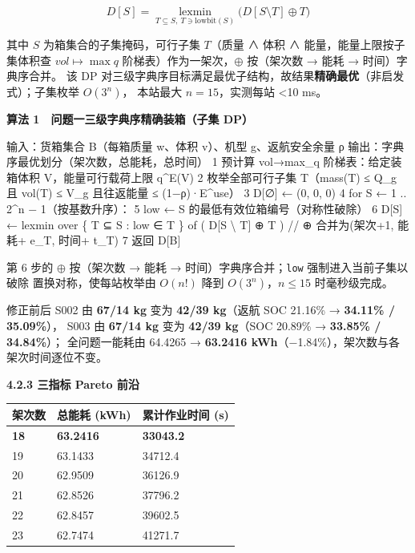 \documentclass[
  10.5pt,
]{extarticle}
\newenvironment{Shaded}{}{}
\newcommand{\NormalTok}[1]{#1}
\newcounter{none} %
\begin{document}
\[D[S]=\operatorname*{lexmin}_{T\subseteq S,\ T\ni \text{lowbit}(S)} \bigl(D[S\setminus T]\oplus T\bigr)\]

其中 \(S\) 为箱集合的子集掩码，可行子集 \(T\)（质量 ∧ 体积 ∧
能量，能量上限按子集体积查 \(vol\mapsto\max q\)
阶梯表）作为一架次，\(\oplus\) 按（架次数 → 能耗 → 时间）字典序合并。 该
DP
对三级字典序目标满足最优子结构，故结果\textbf{精确最优}（非启发式）；子集枚举
\(O(3^n)\)， 本站最大 \(n=15\)，实测每站 \textless10 ms。

\textbf{算法 1　问题一三级字典序精确装箱（子集 DP）}

\begin{Shaded}
\begin{Highlighting}[]
\NormalTok{输入：货箱集合 B（每箱质量 w、体积 v）、机型 g、返航安全余量 ρ}
\NormalTok{输出：字典序最优划分（架次数，总能耗，总时间）}
\NormalTok{ 1  预计算 vol→max\_q 阶梯表：给定装箱体积 V，能量可行载荷上限 q\^{}E(V)}
\NormalTok{ 2  枚举全部可行子集 T（mass(T) ≤ Q\_g 且 vol(T) ≤ V\_g 且往返能量 ≤ (1−ρ)·E\^{}use）}
\NormalTok{ 3  D[∅] ← (0, 0, 0)}
\NormalTok{ 4  for S ← 1 .. 2\^{}n − 1（按基数升序）：}
\NormalTok{ 5      low ← S 的最低有效位箱编号（对称性破除）}
\NormalTok{ 6      D[S] ← lexmin over \{ T ⊆ S : low ∈ T \} of ( D[S \textbackslash{} T] ⊕ T )   // ⊕ 合并为(架次+1, 能耗+ e\_T, 时间+ t\_T)}
\NormalTok{ 7  返回 D[B]}
\end{Highlighting}
\end{Shaded}

第 6 步的 \(\oplus\) 按（架次数 → 能耗 → 时间）字典序合并；\texttt{low}
强制进入当前子集以破除 置换对称，使每站枚举由 \(O(n!)\) 降到
\(O(3^n)\)，\(n\le15\) 时毫秒级完成。

修正前后 S002 由 \textbf{67/14 kg} 变为 \textbf{42/39 kg}（返航 SOC
21.16\% → \textbf{34.11\% / 35.09\%}）， S003 由 \textbf{67/14 kg} 变为
\textbf{42/39 kg}（SOC 20.89\% → \textbf{33.85\% / 34.84\%}）；
全问题一能耗由 64.4265 → \textbf{63.2416
kWh}（−1.84\%），架次数与各架次时间逐位不变。

\textbf{4.2.3 三指标 Pareto 前沿}

{\def\LTcaptype{none} %
\begin{longtable}[]{@{}lll@{}}
\toprule\noalign{}
架次数 & 总能耗 (kWh) & 累计作业时间 (s) \\
\midrule\noalign{}
\endhead
\bottomrule\noalign{}
\endlastfoot
\textbf{18} & \textbf{63.2416} & \textbf{33043.2} \\
19 & 63.1433 & 34712.4 \\
20 & 62.9509 & 36126.9 \\
21 & 62.8526 & 37796.2 \\
22 & 62.8457 & 39602.5 \\
23 & 62.7474 & 41271.7 \\
\end{longtable}
}
\end{document}
